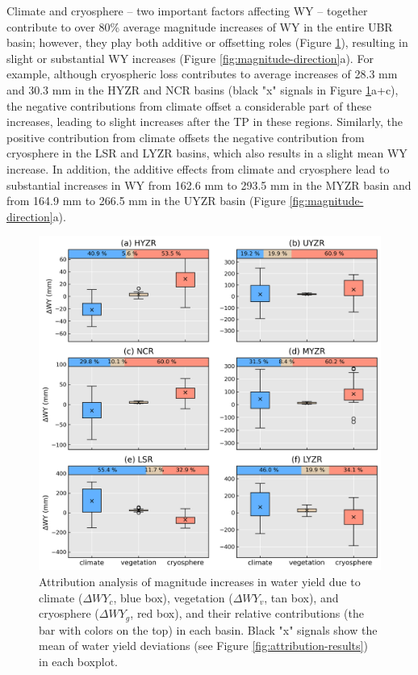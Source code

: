 \documentclass[hess, manuscript]{copernicus}
\begin{document}
Climate and cryosphere -- two important factors affecting WY -- together contribute to over 80\% average magnitude increases of WY in the entire UBR basin; however, they play both additive or offsetting roles (Figure \ref{fig:attribution-magnitude}), resulting in slight or substantial WY increases (Figure \ref{fig:magnitude-direction}a).
For example, although cryospheric loss contributes to average increases of 28.3 mm and 30.3 mm in the HYZR and NCR basins (black "x" signals in Figure \ref{fig:attribution-magnitude}a+c), the negative contributions from climate offset a considerable part of these increases, leading to slight increases after the TP in these regions. 
Similarly, the positive contribution from climate offsets the negative contribution from cryosphere in the LSR and LYZR basins, which also results in a slight mean WY increase. 
In addition, the additive effects from climate and cryosphere lead to substantial increases in WY from 162.6 mm to 293.5 mm in the MYZR basin and from 164.9 mm to 266.5 mm in the UYZR basin (Figure \ref{fig:magnitude-direction}a).

\begin{figure}[ht]
    \includegraphics[width=12cm]{02-figures/attribution-in-magnitude.png}
    \caption{Attribution analysis of magnitude increases in water yield due to climate ($\Delta WY_c$, blue box), vegetation ($\Delta WY_v$, tan box), and cryosphere ($\Delta WY_g$, red box), and their relative contributions (the bar with colors on the top) in each basin. Black "x" signals show the mean of water yield deviations (see Figure \ref{fig:attribution-results}) in each boxplot.}
    \label{fig:attribution-magnitude}
\end{figure}
\end{document}

